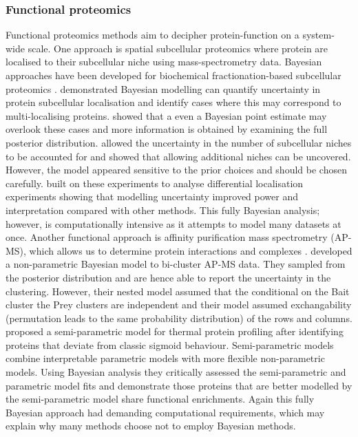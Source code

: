 \documentclass[12pt,english, journal=jpr, layout=twocolumn]{article}
\begin{document}
\subsubsection{Functional proteomics}       
Functional proteomics methods aim to decipher protein-function on a system-wide scale. One approach is spatial subcellular proteomics \citep{Geladaki::2019, Christopher::2021} where protein are localised to their subcellular niche using mass-spectrometry data. Bayesian approaches have been developed for biochemical fractionation-based subcellular proteomics \citep{Crook::2018, Crook::2019, Crook::2019b, Crook::2020, Crook::2021}. \citet{Crook::2018, Crook::2019, Crook::2019b} demonstrated Bayesian modelling can quantify uncertainty in protein subcellular localisation and identify cases where this may correspond to multi-localising proteins. \citet{Crook::2018} showed that a even a Bayesian point estimate may overlook these cases and more information is obtained by examining the full posterior distribution. \citet{Crook::2020} allowed the uncertainty in the number of subcellular niches to be accounted for and showed that allowing additional niches can be uncovered. However, the model appeared sensitive to the prior choices and should be chosen carefully. \citet{Crook::2021} built on these experiments to analyse differential localisation experiments showing that modelling uncertainty improved power and interpretation compared with other methods. This fully Bayesian analysis; however, is computationally intensive as it attempts to model many datasets at once. Another functional approach is affinity purification mass spectrometry (AP-MS), which allows us to determine protein interactions and complexes \citep{Christopher::2021}. \citet{Choi::2010} developed a non-parametric Bayesian model to bi-cluster AP-MS data. They sampled from the posterior distribution and are hence able to report the uncertainty in the clustering. However, their nested model assumed that the conditional on the Bait cluster the Prey clusters are independent and their model assumed exchangability (permutation leads to the same probability distribution) of the rows and columns. \citet{Fang::2021} proposed a semi-parametric model for thermal protein profiling after identifying proteins that deviate from classic sigmoid behaviour. Semi-parametric models combine interpretable parametric models with more flexible non-parametric models. Using Bayesian analysis they critically assessed the semi-parametric and parametric model fits and demonstrate those proteins that are better modelled by the semi-parametric model share functional enrichments. Again this fully Bayesian approach had demanding computational requirements, which may explain why many methods choose not to employ Bayesian methods.
	
\end{document}
